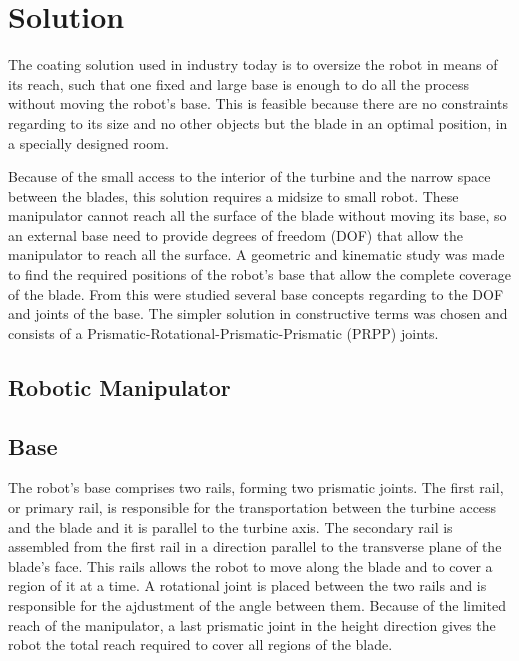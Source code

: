 \section{Solution}


The coating solution used in industry today is to oversize the robot
in means of its reach, such that one fixed and large base is enough to do all 
the process without moving the robot's base. 
This is feasible because there are no constraints regarding to its size and no
other objects but the blade in an optimal position, in a specially designed room.

Because of the small access to the interior of the turbine and the narrow space
between the blades, this solution requires a midsize to small robot. 
These manipulator cannot reach all the surface of the blade without moving its
base, so an external base need to provide degrees of freedom (DOF) that allow
the manipulator to reach all the surface.
A geometric and kinematic study was made to find the required positions of the
robot's base that allow the complete coverage of the blade.
From this were studied several base concepts regarding to the DOF and joints of
the base. The simpler solution in constructive terms was chosen and consists of
a Prismatic-Rotational-Prismatic-Prismatic (PRPP) joints.


\subsection{Robotic Manipulator}

\subsection{Base}

The robot's base comprises two rails, forming two prismatic joints. The first
rail, or primary rail, is responsible for the transportation between the turbine
access and the blade and it is parallel to the turbine axis. The secondary rail
is assembled from the first rail in a direction parallel to the transverse plane
of the blade's face. This rails allows the robot to move along the blade and to
cover a region of it at a time. A rotational joint is placed between the two
rails and is responsible for the ajdustment of the angle between them. 
Because of the limited reach of the manipulator, a last
prismatic joint in the height direction gives the robot the total reach required
to cover all regions of the blade.

